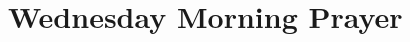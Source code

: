 \documentclass[12pt,twocolumn]{book}
\begin{document}


\section{Wednesday Morning Prayer}






\end{document}
